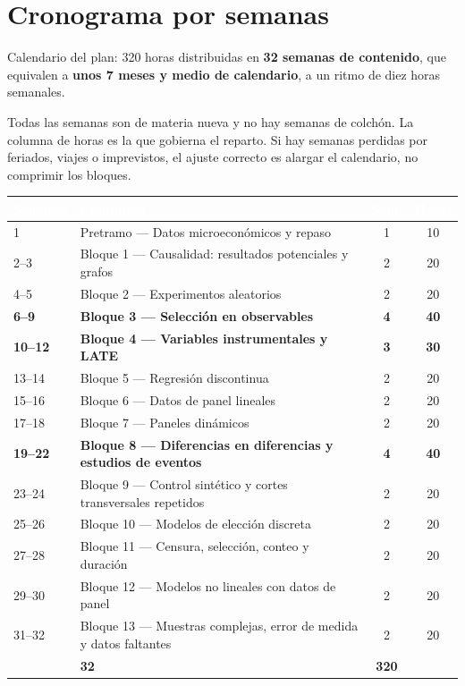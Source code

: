 \documentclass[11pt,a4paper]{article}
\newcommand{\cab}[1]{\textcolor{white}{\sffamily\bfseries #1}}
\newcommand{\filasalternas}{\rowcolors{2}{white}{tonoPalido}}
\begin{document}
\section*{Cronograma por semanas}

Calendario del plan: 320 horas distribuidas en \textbf{32 semanas de
contenido}, que equivalen a \textbf{unos 7 meses y medio de calendario}, a un
ritmo de diez horas semanales.

\medskip
\noindent Todas las semanas son de materia nueva y no hay semanas de colchón.
La columna de horas es la que gobierna el reparto. Si hay semanas perdidas por
feriados, viajes o imprevistos, el ajuste correcto es alargar el calendario,
no comprimir los bloques.

\medskip
{\filasalternas
\noindent\begin{tabularx}{\textwidth}{lXcc}
\toprule
\rowcolor{tonoOscuro}\cab{Semanas} & \cab{Contenido} & \cab{Sem.} & \cab{Horas} \\
\midrule
1 & Pretramo --- Datos microeconómicos y repaso & 1 & 10 \\
2--3 & Bloque 1 --- Causalidad: resultados potenciales y grafos & 2 & 20 \\
4--5 & Bloque 2 --- Experimentos aleatorios & 2 & 20 \\
\rowcolor{tonoHielo}\textbf{6--9} & \textbf{Bloque 3 --- Selección en observables} & \textbf{4} & \textbf{40} \\
\rowcolor{tonoHielo}\textbf{10--12} & \textbf{Bloque 4 --- Variables instrumentales y LATE} & \textbf{3} & \textbf{30} \\
13--14 & Bloque 5 --- Regresión discontinua & 2 & 20 \\
15--16 & Bloque 6 --- Datos de panel lineales & 2 & 20 \\
17--18 & Bloque 7 --- Paneles dinámicos & 2 & 20 \\
\rowcolor{tonoHielo}\textbf{19--22} & \textbf{Bloque 8 --- Diferencias en diferencias y estudios de eventos} & \textbf{4} & \textbf{40} \\
23--24 & Bloque 9 --- Control sintético y cortes transversales repetidos & 2 & 20 \\
25--26 & Bloque 10 --- Modelos de elección discreta & 2 & 20 \\
27--28 & Bloque 11 --- Censura, selección, conteo y duración & 2 & 20 \\
29--30 & Bloque 12 --- Modelos no lineales con datos de panel & 2 & 20 \\
31--32 & Bloque 13 --- Muestras complejas, error de medida y datos faltantes & 2 & 20 \\
\midrule
\rowcolor{tonoHielo}\multicolumn{2}{l}{\textbf{Total}} & \textbf{32} & \textbf{320} \\
\bottomrule
\end{tabularx}
}
\end{document}
